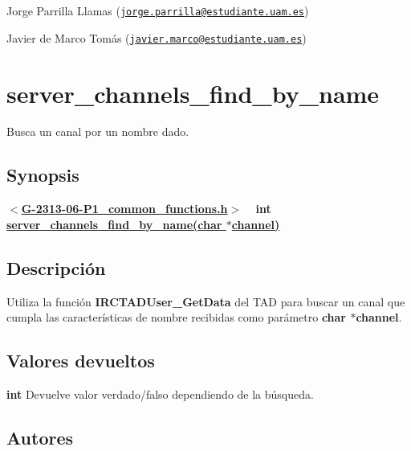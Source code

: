 \begin{DoxyItemize}
\item Jorge Parrilla Llamas (\href{mailto:jorge.parrilla@estudiante.uam.es}{\tt jorge.\+parrilla@estudiante.\+uam.\+es}) 
\item Javier de Marco Tomás (\href{mailto:javier.marco@estudiante.uam.es}{\tt javier.\+marco@estudiante.\+uam.\+es}) 
\end{DoxyItemize}\hypertarget{server_channels_find_by_name}{}\section{server\+\_\+channels\+\_\+find\+\_\+by\+\_\+name}\label{server_channels_find_by_name}
Busca un canal por un nombre dado.\hypertarget{server_channels_find_by_name_synopsis_server_users_find_by_name}{}\subsection{Synopsis}\label{server_channels_find_by_name_synopsis_server_users_find_by_name}
{ {\bfseries $<$\hyperlink{G-2313-06-P1__common__functions_8h}{G-\/2313-\/06-\/\+P1\+\_\+common\+\_\+functions.\+h}$>$} ~\newline
 {\bfseries int \hyperlink{G-2313-06-P1__common__functions_8c_a875ae5278d95716b494b26f96cf4ae6e}{server\+\_\+channels\+\_\+find\+\_\+by\+\_\+name(char $\ast$channel)}} } \hypertarget{server_channels_find_by_name_descripcion_server_channels_find_by_name}{}\subsection{Descripción}\label{server_channels_find_by_name_descripcion_server_channels_find_by_name}
Utiliza la función {\bfseries I\+R\+C\+T\+A\+D\+User\+\_\+\+Get\+Data} del T\+A\+D para buscar un canal que cumpla las características de nombre recibidas como parámetro {\bfseries char $\ast$channel}.\hypertarget{server_channels_find_by_name_return_server_channels_find_by_name}{}\subsection{Valores devueltos}\label{server_channels_find_by_name_return_server_channels_find_by_name}

\begin{DoxyItemize}
\item {\bfseries int} Devuelve valor verdado/falso dependiendo de la búsqueda. 
\end{DoxyItemize}\hypertarget{server_channels_find_by_name_authors_server_channels_find_by_name}{}\subsection{Autores}\label{server_channels_find_by_name_authors_server_channels_find_by_name}

